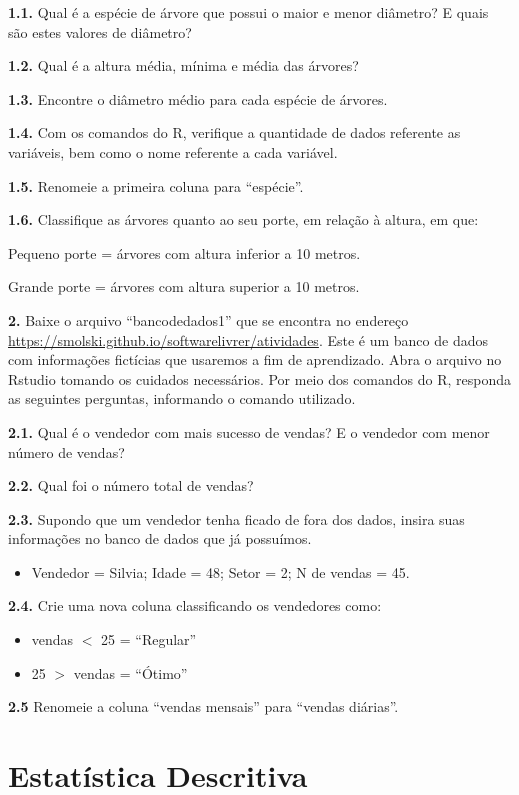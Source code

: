\documentclass[12pt,portuguese,oneside]{book}
\providecommand{\tightlist}{%
  \setlength{\itemsep}{0pt}\setlength{\parskip}{0pt}}
\begin{document}
\textbf{1.1.} Qual é a espécie de árvore que possui o maior e menor
diâmetro? E quais são estes valores de diâmetro?

\textbf{1.2.} Qual é a altura média, mínima e média das árvores?

\textbf{1.3.} Encontre o diâmetro médio para cada espécie de árvores.

\textbf{1.4.} Com os comandos do R, verifique a quantidade de dados
referente as variáveis, bem como o nome referente a cada variável.

\textbf{1.5.} Renomeie a primeira coluna para ``espécie''.

\textbf{1.6.} Classifique as árvores quanto ao seu porte, em relação à
altura, em que:

Pequeno porte = árvores com altura inferior a 10 metros.

Grande porte = árvores com altura superior a 10 metros.

\textbf{2.} Baixe o arquivo ``bancodedados1'' que se encontra no
endereço \url{https://smolski.github.io/softwarelivrer/atividades}. Este
é um banco de dados com informações fictícias que usaremos a fim de
aprendizado. Abra o arquivo no Rstudio tomando os cuidados necessários.
Por meio dos comandos do R, responda as seguintes perguntas, informando
o comando utilizado.

\textbf{2.1.} Qual é o vendedor com mais sucesso de vendas? E o vendedor
com menor número de vendas?

\textbf{2.2.} Qual foi o número total de vendas?

\textbf{2.3.} Supondo que um vendedor tenha ficado de fora dos dados,
insira suas informações no banco de dados que já possuímos.

\begin{itemize}
\tightlist
\item
  Vendedor = Silvia; Idade = 48; Setor = 2; N de vendas = 45.
\end{itemize}

\textbf{2.4.} Crie uma nova coluna classificando os vendedores como:

\begin{itemize}
\item
  vendas \(<\) 25 = ``Regular''
\item
  25 \(>\) vendas = ``Ótimo''
\end{itemize}

\textbf{2.5} Renomeie a coluna ``vendas mensais'' para ``vendas
diárias''.

\hypertarget{desc}{\chapter{Estatística Descritiva}\label{desc}}
\end{document}
